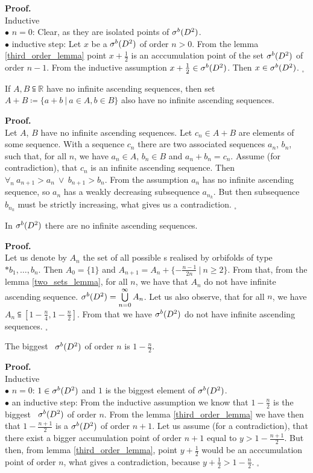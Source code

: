\noindent\textbf{Proof.} \\
Inductive \\
$\bullet$ $n=0$: Clear, as they are isolated points of ${\mathcal{\sigma}^b(D^2)}$. \\
$\bullet$ inductive step: Let $x$ be a \apots  ${\mathcal{\sigma}^b(D^2)}$ of order $n>0$. From the lemma 
\ref{third_order_lemma} point $x+\frac{1}{2}$ is an acccumulation point of the set ${\mathcal{\sigma}^b(D^2)}$  
of order $n-1$. From the inductive assumption $x+\frac{1}{2} \in {\mathcal{\sigma}^b(D^2)}$. Then $x \in {\mathcal{\sigma}^b(D^2)}$. 
$_\square$ 
\begin{lemma}\label{two_sets_lemma}
If $A, B \subseteqq \mathbb{R}$ have no infinite ascending sequences, then set 
$A + B \coloneqq \{a+b\ |\ a \in A, b \in B\}$ also have no infinite ascending sequences. 
\end{lemma}
\noindent\textbf{Proof.} \\
Let $A$, $B$ have no infinite ascending sequences. 
Let $c_n \in A + B$ are elements of some sequence. With a sequence $c_n$ there are 
two associated sequences $a_n$, $b_n$, such that, for all $n$, we have $a_n \in A$, $b_n \in B$ and 
$a_n + b_n = c_n$. Assume (for contradiction), that $c_n$ is an infinite ascending sequence. 
Then $\forall_n\ a_{n+1}>a_n\ \lor\ b_{n+1} > b_n$. From the assumption $a_n$ has no infinite 
ascending sequence, so $a_n$ has a weakly decreasing subsequence $a_{n_k}$. But then 
subsequence $b_{n_k}$ must be strictly increasing, what gives 
us a contradiction. \Lightning $_\square$ 
\begin{lemma}\label{well_order}
In ${\mathcal{\sigma}^b(D^2)}$ there are no infinite ascending sequences.
\end{lemma}
\noindent\textbf{Proof.} \\
Let us denote by $A_n$ the set of all possible \Eoc s realised by orbifolds of type 
$*b_1,\dots,b_n$. Then $A_0 = \{1\}$ and $A_{n+1}=A_n+\{-\frac{n-1}{2n}\ |\ n\geq 2\}$. 
From that, from the lemma \ref{two_sets_lemma}, for all $n$, we have that $A_n$ do not have 
infinite ascending sequence. ${\mathcal{\sigma}^b(D^2)} = \bigcup\limits^\infty_{n=0}A_n$. Let us also observe, that 
for all $n$, we have $A_n \subseteqq [1-\frac{n}{4},1-\frac{n}{2}]$. From that we have ${\mathcal{\sigma}^b(D^2)}$ 
do not have infinite ascending sequences. $_\square$
\begin{theorem}\label{biggest \apots}
The biggest \apots\ ${\mathcal{\sigma}^b(D^2)}$ of order $n$ is $1-\frac{n}{2}$.
\end{theorem}
\noindent\textbf{Proof.}\\
Inductive \\
$\bullet$ $n=0$: $1\in {\mathcal{\sigma}^b(D^2)}$ and $1$ is the biggest element of ${\mathcal{\sigma}^b(D^2)}$. \\
$\bullet$ an inductive step: From the inductive assumption we know that $1-\frac{n}{2}$ is 
the biggest \apots\  ${\mathcal{\sigma}^b(D^2)}$ of order $n$. From the lemma \ref{third_order_lemma} we have then 
that $1-\frac{n+1}{2}$ is a \apots  ${\mathcal{\sigma}^b(D^2)}$ of order $n+1$. Let us assume (for a contradiction), 
that there exist a bigger accumulation point of order $n+1$ equal to $y > 1-\frac{n+1}{2}$. 
But then, from lemma \ref{third_order_lemma}, point $y+\frac{1}{2}$ would be an acccumulation point 
of order $n$, what gives a contradiction, because $y+\frac{1}{2}>1-\frac{n}{2}$. $_\square$ 
